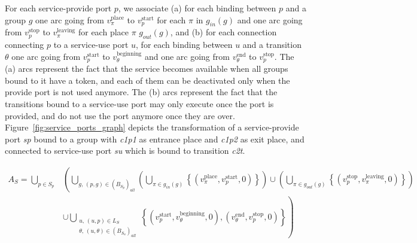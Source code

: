 For each service-provide port $p$, we associate (a) for each binding between
$p$ and a group $g$ one arc going from $v_\pi^\text{place}$ to $v_p^\text{start}$
for each $\pi$ in $g_{in}(g)$ and one arc going from $v_p^\text{stop}$ to
$v_\pi^\text{leaving}$ for each place $\pi$ $g_{out}(g)$, and (b) for each
connection connecting $p$ to a service-use port $u$, for each binding between
$u$ and a transition $\theta$ one arc going from $v_p^\text{start}$ to
$v_\theta^\text{beginning}$ and one arc going from $v_\theta^\text{end}$ to
$v_p^\text{stop}$.
The (a) arcs represent the fact that the service becomes available when all
groups bound to it have a token, and each of them can be deactivated only when
the provide port is not used anymore. The (b) arcs represent the
fact that the transitions bound to a service-use port may only execute once
the port is provided, and do not use the port anymore once they are over.
Figure~\ref{fig:service_ports_graph} depicts the transformation of a
service-provide port \emph{sp} bound to a group with \emph{c1p1} as entrance
place and \emph{c1p2} as exit place, and connected to service-use port
\emph{su} which is bound to transition \emph{c2t}.


\begin{align*}
A_{S}=\bigcup_{p\in S_p}
& \left(\bigcup_{g,\,\left(p,g\right)\in\left(B_{S_{p}}\right)_{all}}\left(\bigcup_{\pi\in g_{in}(g)} \left\{\left(v_\pi^\text{place},v_p^\text{start},0\right)\right\}\right)\cup\left(\bigcup_{\pi\in g_{out}(g)} \left\{\left(v_p^\text{stop},v_\pi^\text{leaving},0\right)\right\}\right)\right. \\
& \left.\cup\bigcup_{\substack{u,\,\left(u,p\right)\in L_S \\ \theta,\,\left(u,\theta\right)\in\left(B_{S_{u}}\right)_{all}}}\left\{ \left(v_p^\text{start},v_\theta^\text{beginning},0\right),\left(v_\theta^\text{end},v_p^\text{stop},0\right)\right\}\right)
\end{align*}

